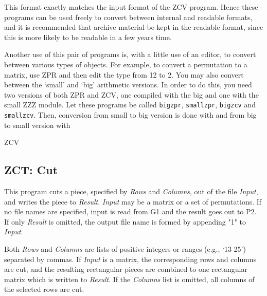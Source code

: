 This format exactly matches the input format of the ZCV program. Hence
these programs can be used freely to convert between internal and
readable formats, and it is recommended that archive material be kept
in the readable format, since this is more likely to be readable in a
few years time.

Another use of this pair of programs is, with a little
use of an editor, to convert between various types of objects. For
example, to convert a permutation to a matrix, use ZPR and then edit
the type from 12 to 2.
You may also convert between the `small' and `big' arithmetic versions.
In order to do this, you need two versions of both ZPR and ZCV, one
compiled with the big and one with the small ZZZ module.
Let these programs be called {\tt bigzpr}, {\tt smallzpr}, {\tt bigzcv}
and {\tt smallzcv}. Then, conversion from small to big version is
done with
and from big to small version with


\SeeAlso
ZCV


\subsection{ZCT: Cut}
\Syntax
{}

\Description
This program cuts a piece, specified by {\it Rows} and {\it Columns},
out of the file {\it Input}, and writes the piece to {\it Result}.
{\it Input} may be a matrix or a set of permutations.
If no file names are specified, input is read from G1 and the result
goes out to P2. If only {\it Result} is omitted, the output file name
is formed by appending "1" to {\it Input}.

Both {\it Rows} and {\it Columns} are lists of positive
integers or ranges (e.g., `13-25') separated by commas.
If {\it Input} is a matrix, the corresponding
rows and columns are cut, and the resulting rectangular pieces
are combined to one rectangular matrix which is written to
{\it Result}. If the {\it Columns} list is omitted, all columns
of the selected rows are cut.

